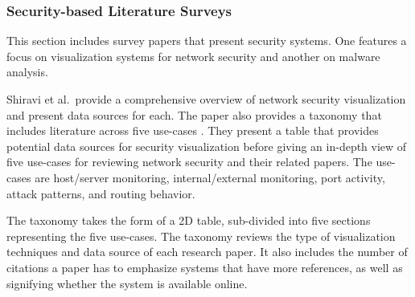 \subsubsection{Security-based Literature Surveys}
This section includes survey papers that present security systems. One features a focus on visualization systems for network security and  another on malware analysis.

Shiravi et al.\  provide a comprehensive overview of network security visualization and present data sources for each. The paper also provides a taxonomy that includes literature across five use-cases \cite{shiravi2012survey}.
They present a table that provides potential data sources for security visualization before giving an in-depth view of five use-cases for reviewing network security and their related papers. The use-cases are host/server monitoring, internal/external monitoring, port activity, attack patterns, and routing behavior.

The taxonomy takes the form of a 2D table, sub-divided into five sections representing the five use-cases. The taxonomy reviews the type of visualization techniques and data source of each research paper. It also includes the number of citations a paper has to emphasize systems that have more references, as well as signifying whether the system is available online.

